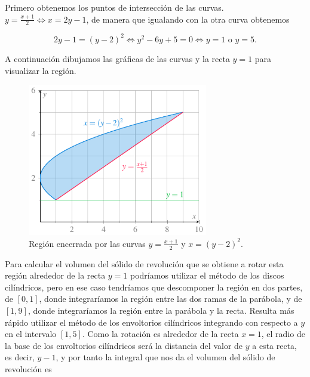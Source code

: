 \documentclass[
  a4paper,
]{scrreport}
\theoremstyle{definition}
\theoremstyle{remark}
\begin{document}
\begin{tcolorbox}[enhanced jigsaw, breakable, bottomtitle=1mm, colframe=quarto-callout-tip-color-frame, opacityback=0, title=\textcolor{quarto-callout-tip-color}{\faLightbulb}\hspace{0.5em}{Solución}, arc=.35mm, coltitle=black, toptitle=1mm, toprule=.15mm, left=2mm, titlerule=0mm, leftrule=.75mm, opacitybacktitle=0.6, colbacktitle=quarto-callout-tip-color!10!white, colback=white, bottomrule=.15mm, rightrule=.15mm]

Primero obtenemos los puntos de intersección de las curvas.
\(y=\frac{x+1}{2} \Leftrightarrow x = 2y-1\), de manera que igualando
con la otra curva obtenemos

\[
2y-1 = (y-2)^2 \Leftrightarrow y^2 - 6y + 5 = 0 \Leftrightarrow y = 1 \mbox{ o } y = 5.
\]

A continuación dibujamos las gráficas de las curvas y la recta \(y=1\)
para visualizar la región.

\begin{figure}[H]

{\centering \includegraphics[width=0.7\textwidth,height=\textheight]{img/examen-2024-04-16/region-solido-revolucion-int-10-gen.pdf}

}

\caption{Región encerrada por las curvas \(y=\frac{x+1}{2}\) y
\(x=(y-2)^2\).}

\end{figure}%

Para calcular el volumen del sólido de revolución que se obtiene a rotar
esta región alrededor de la recta \(y=1\) podríamos utilizar el método
de los discos cilíndricos, pero en ese caso tendríamos que descomponer
la región en dos partes, de \([0, 1]\), donde integraríamos la región
entre las dos ramas de la parábola, y de \([1, 9]\), donde integraríamos
la región entre la parábola y la recta. Resulta más rápido utilizar el
método de los envoltorios cilíndricos integrando con respecto a \(y\) en
el intervalo \([1, 5]\). Como la rotación es alrededor de la recta
\(x=1\), el radio de la base de los envoltorios cilíndricos será la
distancia del valor de \(y\) a esta recta, es decir, \(y-1\), y por
tanto la integral que nos da el volumen del sólido de revolución es


\end{tcolorbox}
\end{document}
